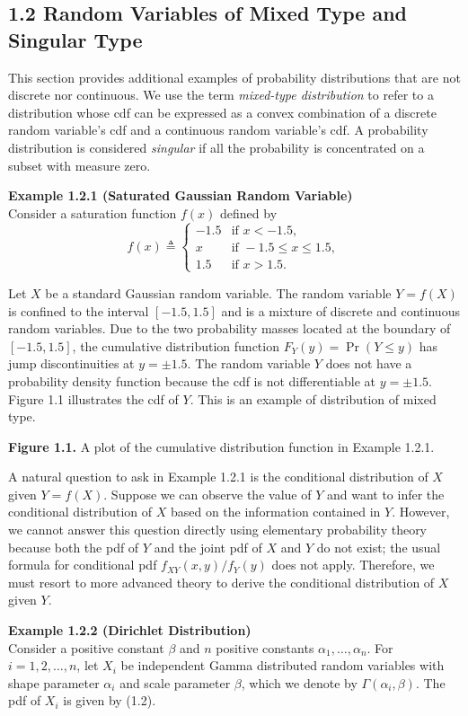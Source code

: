 \subsection*{1.2 Random Variables of Mixed Type and Singular Type}

This section provides additional examples of probability distributions that are not discrete nor continuous. We use the term \textit{mixed-type distribution} to refer to a distribution whose cdf can be expressed as a convex combination of a discrete random variable's cdf and a continuous random variable's cdf. A probability distribution is considered \textit{singular} if all the probability is concentrated on a subset with measure zero.

\textbf{Example 1.2.1 (Saturated Gaussian Random Variable)} \\
Consider a saturation function $f(x)$ defined by
\[
f(x)\triangleq
\begin{cases}
-1.5 & \text{if } x<-1.5,\\
x & \text{if } -1.5\le x\le 1.5,\\
1.5 & \text{if } x>1.5.
\end{cases}
\]

Let $X$ be a standard Gaussian random variable. The random variable $Y=f(X)$ is confined to the interval $[-1.5,1.5]$ and is a mixture of discrete and continuous random variables. Due to the two probability masses located at the boundary of $[-1.5,1.5]$, the cumulative distribution function $F_Y(y)=\Pr(Y\le y)$ has jump discontinuities at $y=\pm 1.5$. The random variable $Y$ does not have a probability density function because the cdf is not differentiable at $y=\pm 1.5$. Figure 1.1 illustrates the cdf of $Y$. This is an example of distribution of mixed type.

\textbf{Figure 1.1.} A plot of the cumulative distribution function in Example 1.2.1.

A natural question to ask in Example 1.2.1 is the conditional distribution of $X$ given $Y=f(X)$. Suppose we can observe the value of $Y$ and want to infer the conditional distribution of $X$ based on the information contained in $Y$. However, we cannot answer this question directly using elementary probability theory because both the pdf of $Y$ and the joint pdf of $X$ and $Y$ do not exist; the usual formula for conditional pdf $f_{XY}(x,y)/f_Y(y)$ does not apply. Therefore, we must resort to more advanced theory to derive the conditional distribution of $X$ given $Y$.

\textbf{Example 1.2.2 (Dirichlet Distribution)} \\
Consider a positive constant $\beta$ and $n$ positive constants $\alpha_1,\dots,\alpha_n$. For $i=1,2,\dots,n$, let $X_i$ be independent Gamma distributed random variables with shape parameter $\alpha_i$ and scale parameter $\beta$, which we denote by $\Gamma(\alpha_i,\beta)$. The pdf of $X_i$ is given by (1.2).

